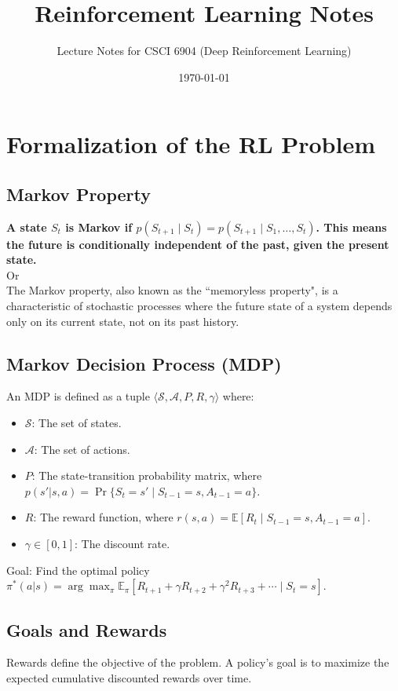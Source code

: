 \documentclass[12pt]{article}
\title{Reinforcement Learning Notes}
\author{Lecture Notes for CSCI 6904 (Deep Reinforcement Learning)}
\date{\today}
\begin{document}
\maketitle
\tableofcontents

\newpage

\section{Formalization of the RL Problem }


\subsection{Markov Property}
\textbf{A state $S_t$ is Markov if $p(S_{t+1} \mid S_t) = p(S_{t+1} \mid S_1, \dots, S_t)$. This means the future is conditionally independent of the past, given the present state.} \\
Or \\
The Markov property, also known as the ``memoryless property", is a characteristic of stochastic processes where the future state of a system depends only on its current state, not on its past history.

\subsection{Markov Decision Process (MDP)}
An MDP is defined as a tuple $\langle \mathcal{S}, \mathcal{A}, P, R, \gamma \rangle$ where:
\begin{itemize}
    \item $\mathcal{S}$: The set of states.
    \item $\mathcal{A}$: The set of actions.
    \item $P$: The state-transition probability matrix, where $p(s'|s,a) = \Pr\{S_t = s' \mid S_{t-1} = s, A_{t-1} = a\}$.
    \item $R$: The reward function, where $r(s,a) = \mathbb{E}[R_t \mid S_{t-1} = s, A_{t-1} = a]$.
    \item $\gamma \in [0,1]$: The discount rate.
\end{itemize}
Goal: Find the optimal policy $\pi^*(a|s) = \arg\max_\pi \mathbb{E}_\pi [R_{t+1} + \gamma R_{t+2} + \gamma^2 R_{t+3} + \cdots \mid S_t = s]$.


\subsection{Goals and Rewards}
Rewards define the objective of the problem. A policy's goal is to maximize the expected cumulative discounted rewards over time.
\end{document}
